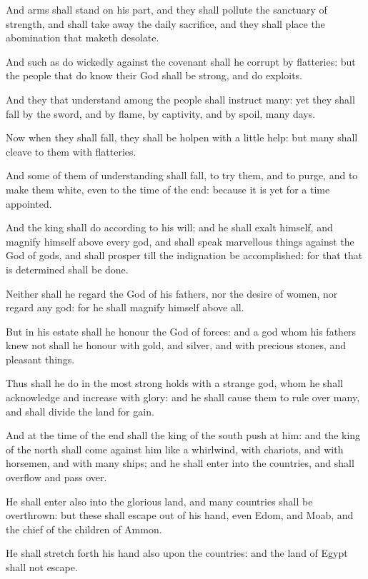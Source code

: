 \Verse And arms shall stand on his part, and they shall pollute the sanctuary of strength, and shall take away the daily sacrifice, and they shall place the abomination that maketh desolate.

\Verse And such as do wickedly against the covenant shall he corrupt by flatteries: but the people that do know their God shall be strong, and do exploits.

\Verse And they that understand among the people shall instruct many: yet they shall fall by the sword, and by flame, by captivity, and by spoil, many days.

\Verse Now when they shall fall, they shall be holpen with a little help: but many shall cleave to them with flatteries.

\Verse And some of them of understanding shall fall, to try them, and to purge, and to make them white, even to the time of the end: because it is yet for a time appointed.

\Verse And the king shall do according to his will; and he shall exalt himself, and magnify himself above every god, and shall speak marvellous things against the God of gods, and shall prosper till the indignation be accomplished: for that that is determined shall be done.

\Verse Neither shall he regard the God of his fathers, nor the desire of women, nor regard any god: for he shall magnify himself above all.

\Verse But in his estate shall he honour the God of forces: and a god whom his fathers knew not shall he honour with gold, and silver, and with precious stones, and pleasant things.

\Verse Thus shall he do in the most strong holds with a strange god, whom he shall acknowledge and increase with glory: and he shall cause them to rule over many, and shall divide the land for gain.

\Verse And at the time of the end shall the king of the south push at him: and the king of the north shall come against him like a whirlwind, with chariots, and with horsemen, and with many ships; and he shall enter into the countries, and shall overflow and pass over.

\Verse He shall enter also into the glorious land, and many countries shall be overthrown: but these shall escape out of his hand, even Edom, and Moab, and the chief of the children of Ammon.

\Verse He shall stretch forth his hand also upon the countries: and the land of Egypt shall not escape.

